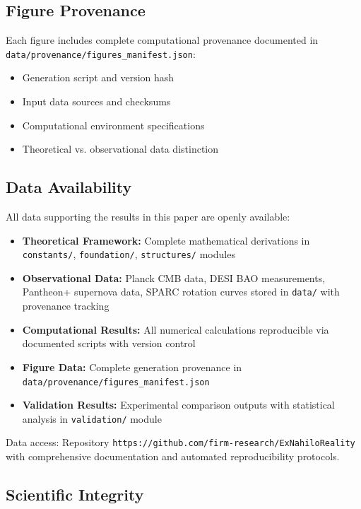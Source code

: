 \documentclass[12pt]{article}
\begin{document}
\subsection{Figure Provenance}

Each figure includes complete computational provenance documented in \texttt{data/provenance/figures\_manifest.json}:
\begin{itemize}
    \item Generation script and version hash
    \item Input data sources and checksums  
    \item Computational environment specifications
    \item Theoretical vs. observational data distinction
\end{itemize}

\subsection{Data Availability}

All data supporting the results in this paper are openly available:

\begin{itemize}
    \item \textbf{Theoretical Framework:} Complete mathematical derivations in \texttt{constants/}, \texttt{foundation/}, \texttt{structures/} modules
    \item \textbf{Observational Data:} Planck CMB data, DESI BAO measurements, Pantheon+ supernova data, SPARC rotation curves stored in \texttt{data/} with provenance tracking
    \item \textbf{Computational Results:} All numerical calculations reproducible via documented scripts with version control
    \item \textbf{Figure Data:} Complete generation provenance in \texttt{data/provenance/figures\_manifest.json}
    \item \textbf{Validation Results:} Experimental comparison outputs with statistical analysis in \texttt{validation/} module
\end{itemize}

Data access: Repository \texttt{https://github.com/firm-research/ExNahiloReality} with comprehensive documentation and automated reproducibility protocols.

\subsection{Scientific Integrity}
\end{document}
